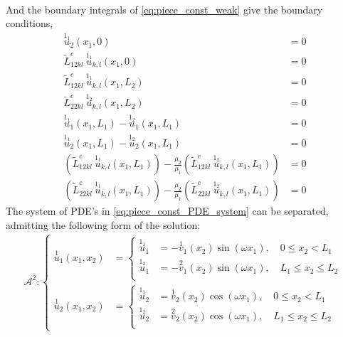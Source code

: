 \documentclass[11pt]{report}
\begin{document}
\begin{appendices}
\begin{equation}
\begin{aligned}
\end{aligned}
\end{equation}
And the boundary integrals of \eqref{eq:piece_const_weak} give the boundary conditions,
\begin{equation} \label{eq:piece_const_u1_bcs}
\begin{aligned}
\overset{1_1}{u}_2(x_1, 0) &= 0 \\
\tilde{L}^c_{12kl} \: \overset{1_1}{u}_{k,l}(x_1, 0) &= 0 \\
\tilde{L}^c_{12kl} \: \overset{1_1}{u}_{k,l}(x_1, L_2) &= 0 \\
\tilde{L}^c_{22kl} \: \overset{1_2}{u}_{k,l}(x_1, L_2) &= 0 \\
\overset{1_1}{u}_1(x_1, L_1) - \overset{1_2}{u}_1(x_1, L_1) &= 0 \\
\overset{1_1}{u}_2(x_1, L_1) - \overset{1_2}{u}_2(x_1, L_1) &= 0 \\
\left ( \tilde{L}^c_{12kl} \: \overset{1_1}{u}_{k,l}(x_1, L_1) \right ) - \frac{\mu_2}{\mu_1} \left( \tilde{L}^c_{12kl} \: \overset{1_2}{u}_{k,l}(x_1, L_1) \right )  &= 0 \\
\left ( \tilde{L}^c_{22kl} \: \overset{1_1}{u}_{k,l}(x_1, L_1) \right ) - \frac{\mu_2}{\mu_1} \left( \tilde{L}^c_{22kl} \: \overset{1_2}{u}_{k,l}(x_1, L_1) \right )  &= 0
\end{aligned}
\end{equation}
The system of PDE's in \eqref{eq:piece_const_PDE_system} can be separated, admitting the following form of the solution:
\begin{equation} \label{eq:piece_const_u2_form}
\begin{aligned}
\mathcal{A}^2 : \left \{
\begin{aligned}
\overset{1}{u}_1(x_1, x_2) &= \left \{
\begin{aligned}
  \overset{1_1}{u}_1 &= -\overset{1}{v}_1(x_2) \sin( \omega x_1), \quad  0 \leq x_2 < L_1\\
  \overset{1_2}{u}_1 &= -\overset{2}{v}_1(x_2) \sin( \omega x_1), \quad  L_1 \leq x_2 \leq L_2 \\
\end{aligned}
\right.
\\
\overset{1}{u}_2(x_1, x_2) &= \left \{
\begin{aligned}
  \overset{1_1}{u}_2 &= \overset{1}{v}_2(x_2) \cos( \omega x_1), \quad  0 \leq x_2 < L_1\\
\overset{1_2}{u}_2 &= \overset{2}{v}_2(x_2) \cos( \omega x_1), \quad  L_1 \leq x_2 \leq L_2\\

\end{aligned}
\end{aligned}
\end{aligned}
\end{equation}
\end{appendices}
\end{document}
